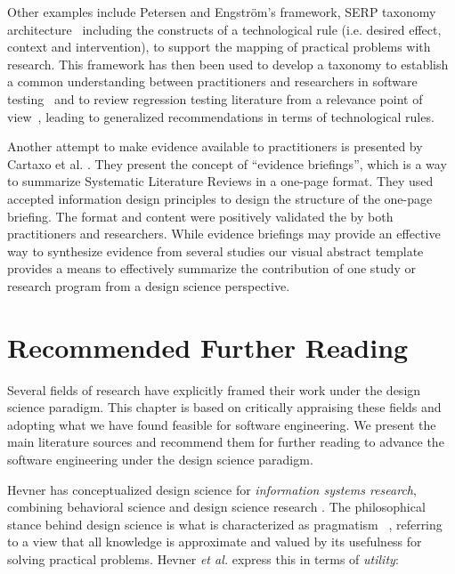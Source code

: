 \documentclass[graybox]{svmult}
\newcommand{\emelie}[1]{\textcolor{red}{{\it [Emelie says: #1]}}}
\newcommand{\emelie}[1]{}
\begin{document}
Other examples include Petersen and Engstr\"om's framework, SERP taxonomy architecture~\cite{petersen_finding_2014} including the constructs of a technological rule  
(i.e. desired effect, context and intervention), to support the mapping of practical problems with research. 
This framework has then been used to develop a taxonomy to establish a common understanding between practitioners and researchers in software testing~\cite{engstrom_SERP-test_2017} and to review regression testing literature from a relevance point of view~\cite{ali_search_2019}, leading to generalized recommendations in terms of technological rules. 

Another attempt to make evidence available to practitioners is presented by Cartaxo et al. \cite{Cartaxo2016}. 
They present the concept of ``evidence briefings'', which is a way to summarize Systematic Literature Reviews in a one-page format. 
They used accepted information design principles to design the structure of the one-page briefing. The format and content were positively validated the by both practitioners and researchers. While evidence briefings may provide an effective way to synthesize evidence from several studies our visual abstract template provides a means to effectively summarize the contribution of one study or research program from a design science perspective.



\section{Recommended Further Reading}
\label{sec:reading}
Several fields of research have explicitly framed their work under the design science paradigm. This chapter is based on critically appraising these fields and adopting what we have found feasible for software engineering. We present the main literature sources and recommend them for further reading to advance the software engineering under the design science paradigm.

Hevner has conceptualized design science for \emph{information systems research}, combining behavioral science and design science research \cite{hevner_design_2004,hevner_design_2010}.
The philosophical stance behind design science is what is characterized as pragmatism~\cite{easterbrook_selecting_2008}%
, referring to a view that all knowledge is approximate and valued by its usefulness for solving practical problems. Hevner \emph{et al.} express this in terms of \emph{utility}: 
\end{document}
